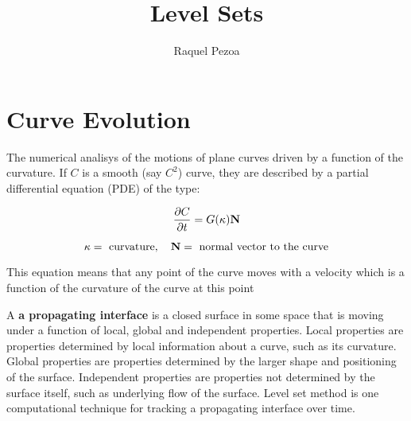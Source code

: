 \documentclass{ws-procs9x6}
\begin{document}
\title{Level Sets}

\author{Raquel Pezoa}

\address{Universidad T\'ecnica Federico Santa Mar\'ia, \\
Avenida Espa\~na 1680, \\ 
Valpara\'iso, Chile\\ 
E-mail: rpezoa@usm.cl}



\maketitle


\section{Curve Evolution}


The numerical analisys of the motions of plane curves driven  by a function of
the curvature. If $C$ is a smooth (say $C^{2}$) curve, they are described by a
partial differential equation (PDE) of the type:

$$\frac{\partial C}{\partial t}=G(\kappa)\bold{N}$$

$$\kappa= \text{ curvature}, \ \ \ \bold{N}=\text{ normal vector to the curve}$$

This equation means that any point of the curve moves with a velocity which is a function of the curvature of the curve at this point


A \textbf{a propagating interface } is a closed surface in some space that is moving under a function of local, global and independent properties. Local properties are properties determined by local information about a curve, such as its curvature. Global properties are properties determined by the larger shape and positioning of the surface. Independent properties are properties not determined by the surface itself, such as underlying flow of the surface.
Level set method is one computational technique for tracking a propagating interface over time.
\end{document}
